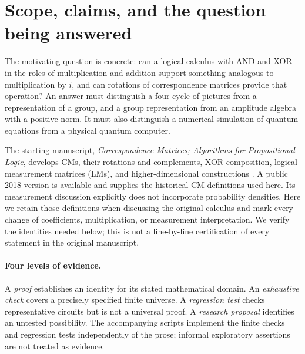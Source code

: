 \section{Scope, claims, and the question being answered}\label{sec:scope}
The motivating question is concrete: can a logical calculus with AND and XOR in the roles of multiplication and addition support something analogous to multiplication by $i$, and can rotations of correspondence matrices provide that operation? An answer must distinguish a four-cycle of pictures from a representation of a group, and a group representation from an amplitude algebra with a positive norm. It must also distinguish a numerical simulation of quantum equations from a physical quantum computer.

The starting manuscript, \emph{Correspondence Matrices; Algorithms for Propositional Logic}, develops CMs, their rotations and complements, XOR composition, logical measurement matrices (LMs), and higher-dimensional constructions \cite{droncheff}. A public 2018 version is available and supplies the historical CM definitions used here. Its measurement discussion explicitly does not incorporate probability densities. Here we retain those definitions when discussing the original calculus and mark every change of coefficients, multiplication, or measurement interpretation. We verify the identities needed below; this is not a line-by-line certification of every statement in the original manuscript.

\paragraph{Four levels of evidence.}
A \emph{proof} establishes an identity for its stated mathematical domain. An \emph{exhaustive check} covers a precisely specified finite universe. A \emph{regression test} checks representative circuits but is not a universal proof. A \emph{research proposal} identifies an untested possibility. The accompanying scripts implement the finite checks and regression tests independently of the prose; informal exploratory assertions are not treated as evidence.

